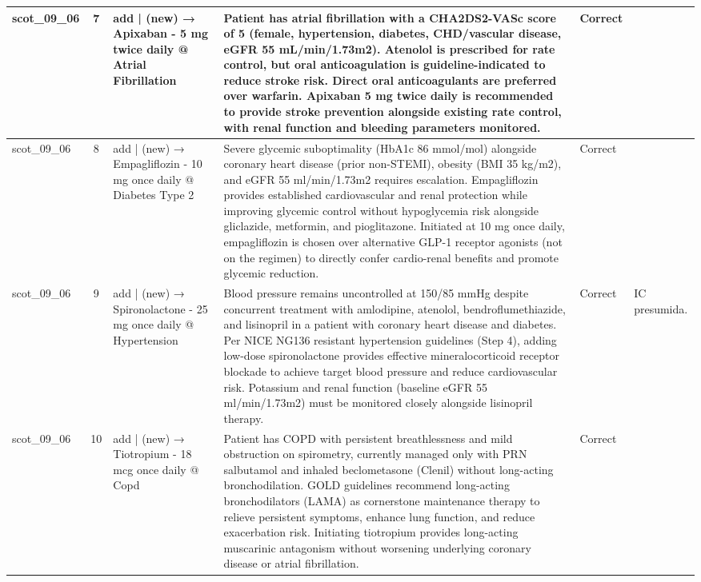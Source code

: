 \begin{longtable}{|p{1.45cm}|c|p{3.3cm}|p{6.5cm}|p{1.55cm}|p{2.3cm}|}
\hline
scot\_09\_06 & 7 & add | (new) → Apixaban - 5 mg twice daily @ Atrial Fibrillation & Patient has atrial fibrillation with a CHA2DS2-VASc score of 5 (female, hypertension, diabetes, CHD/vascular disease, eGFR 55 mL/min/1.73m2). Atenolol is prescribed for rate control, but oral anticoagulation is guideline-indicated to reduce stroke risk. Direct oral anticoagulants are preferred over warfarin. Apixaban 5 mg twice daily is recommended to provide stroke prevention alongside existing rate control, with renal function and bleeding parameters monitored. & Correct &  \\
\hline
scot\_09\_06 & 8 & add | (new) → Empagliflozin - 10 mg once daily @ Diabetes Type 2 & Severe glycemic suboptimality (HbA1c 86 mmol/mol) alongside coronary heart disease (prior non-STEMI), obesity (BMI 35 kg/m2), and eGFR 55 ml/min/1.73m2 requires escalation. Empagliflozin provides established cardiovascular and renal protection while improving glycemic control without hypoglycemia risk alongside gliclazide, metformin, and pioglitazone. Initiated at 10 mg once daily, empagliflozin is chosen over alternative GLP-1 receptor agonists (not on the regimen) to directly confer cardio-renal benefits and promote glycemic reduction. & Correct &  \\
\hline
scot\_09\_06 & 9 & add | (new) → Spironolactone - 25 mg once daily @ Hypertension & Blood pressure remains uncontrolled at 150/85 mmHg despite concurrent treatment with amlodipine, atenolol, bendroflumethiazide, and lisinopril in a patient with coronary heart disease and diabetes. Per NICE NG136 resistant hypertension guidelines (Step 4), adding low-dose spironolactone provides effective mineralocorticoid receptor blockade to achieve target blood pressure and reduce cardiovascular risk. Potassium and renal function (baseline eGFR 55 ml/min/1.73m2) must be monitored closely alongside lisinopril therapy. & Correct & IC presumida. \\
\hline
scot\_09\_06 & 10 & add | (new) → Tiotropium - 18 mcg once daily @ Copd & Patient has COPD with persistent breathlessness and mild obstruction on spirometry, currently managed only with PRN salbutamol and inhaled beclometasone (Clenil) without long-acting bronchodilation. GOLD guidelines recommend long-acting bronchodilators (LAMA) as cornerstone maintenance therapy to relieve persistent symptoms, enhance lung function, and reduce exacerbation risk. Initiating tiotropium provides long-acting muscarinic antagonism without worsening underlying coronary disease or atrial fibrillation. & Correct &  \\

\end{longtable}
